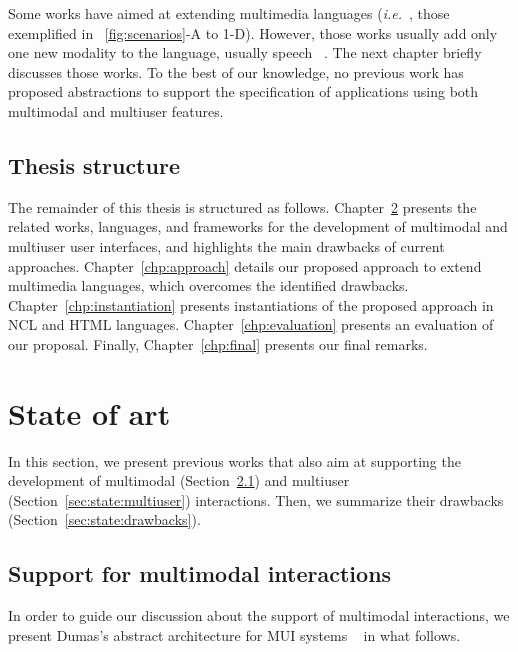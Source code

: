 \documentclass[
  doutorado,
  american
]{ThesisPUC}
\newcommand{\fig}[1]{\figurename~\ref{#1}}
\newcommand{\chp}[1]{Chapter~\ref{#1}}
\newcommand{\sect}[1]{Section~\ref{#1}}
\begin{document}
Some works have aimed at extending multimedia languages (\textit{i.e.}~, those exemplified
in \fig{fig:scenarios}-A to 1-D). However, those works usually add only one new
modality to the language, usually speech
~\cite{beckham_towards_2001,carvalho_architectures_2008,
carvalho_estendendo_2010,	w3c_xhtml+voice_2001,wang_salt:_2002}. The next
chapter briefly discusses those works. To the best of our knowledge, no previous
work has proposed abstractions to support the specification of applications
using both multimodal and multiuser features. 

\section{Thesis structure}
\label{sec:intro:structure}

The remainder of this thesis is structured as follows. \chp{chp:state} presents
the related works, languages, and frameworks for the development of multimodal
and multiuser user interfaces, and highlights the main drawbacks of current
approaches. \chp{chp:approach} details our proposed approach to extend
multimedia languages, which overcomes the identified drawbacks.
\chp{chp:instantiation} presents instantiations of the proposed approach in NCL
and HTML languages. \chp{chp:evaluation} presents an evaluation of our proposal.
Finally, \chp{chp:final} presents our final remarks.

\chapter{State of art}
\label{chp:state} In this section, we present previous works that also aim at
supporting the development of multimodal (\sect{sec:state:multimodal}) and
multiuser (\sect{sec:state:multiuser}) interactions. Then, we summarize their
drawbacks (\sect{sec:state:drawbacks}).

\section{Support for multimodal interactions}
\label{sec:state:multimodal}

In order to guide our discussion about the support of multimodal interactions,
we present Dumas’s abstract architecture for MUI systems
~\cite{dumas_multimodal_2009} in what follows.
\end{document}

